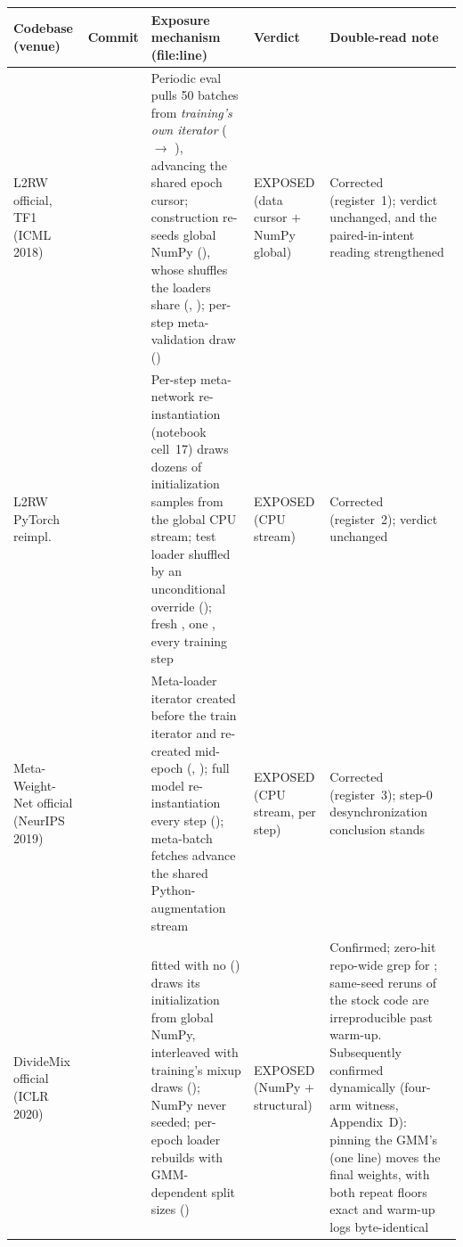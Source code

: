 \begin{table}[tbp]
\centering
\footnotesize
\setlength{\tabcolsep}{4pt}
\begin{tabular}{@{}L{2.0cm}L{1.1cm}L{5.7cm}L{1.6cm}L{3.3cm}@{}}
\toprule
Codebase (venue) & Commit & Exposure mechanism (file:line) & Verdict &
Double-read note \\
\midrule
L2RW official, TF1 (ICML 2018) &  &
Periodic eval pulls 50 batches from \emph{training's own iterator}
( $\to$ ), advancing the
shared epoch cursor;  construction re-seeds global NumPy
(), whose shuffles the loaders share
(, ); per-step meta-validation draw
() &
EXPOSED (data cursor $+$ NumPy global) &
Corrected (register~1); verdict unchanged, and the
paired-in-intent reading strengthened \\
\addlinespace
L2RW PyTorch reimpl. &  &
Per-step meta-network re-instantiation (notebook cell~17) draws dozens of
initialization samples from the global CPU stream; test loader shuffled by
an unconditional override (); fresh
, one , every training step &
EXPOSED (CPU stream) &
Corrected (register~2); verdict unchanged \\
\addlinespace
Meta-Weight-Net official (NeurIPS 2019) &  &
Meta-loader iterator created before the train iterator and re-created
mid-epoch (, ); full model
re-instantiation every step (); meta-batch fetches advance
the shared Python- augmentation stream &
EXPOSED (CPU stream, per step) &
Corrected (register~3); step-0 desynchronization conclusion stands \\
\addlinespace
DivideMix official (ICLR 2020) &  &
 fitted with no 
() draws its initialization from global
NumPy, interleaved with training's  mixup draws
(); NumPy never seeded; per-epoch loader rebuilds with
GMM-dependent split sizes () &
EXPOSED (NumPy $+$ structural) &
Confirmed; zero-hit repo-wide grep for ; same-seed
reruns of the stock code are irreproducible past warm-up. Subsequently
confirmed dynamically (four-arm witness, Appendix~D): pinning the GMM's
 (one line) moves the final weights, with both
repeat floors exact and warm-up logs byte-identical \\

\end{tabular}
\end{table}
